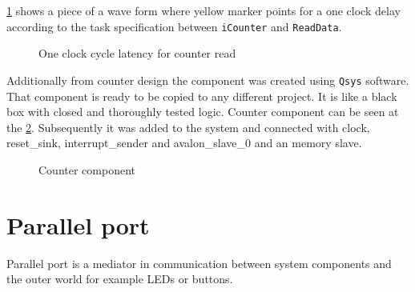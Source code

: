\figurename{} \ref{fig:counter_read_latency} shows a piece of a wave form where yellow marker points for a one clock delay according to the task specification between \verb|iCounter| and \verb|ReadData|.

\begin{figure}[H]
	\begin{center}
	\end{center}
	\caption{One clock cycle latency for counter read}
	\label{fig:counter_read_latency}
\end{figure}

Additionally from counter design the component was created using \verb|Qsys| software. That component is ready to be copied  to any different project. It is like a black box with closed and thoroughly tested logic. Counter component can be seen at the \figurename{} \ref{fig:interrupt_counter_component}. Subsequently it was added to the system and connected with clock, reset\_sink, interrupt\_sender and avalon\_slave\_0 and an memory slave.

\begin{figure}[H]
	\begin{center}
	\end{center}
	\caption{Counter component}
	\label{fig:interrupt_counter_component}
\end{figure}

\section{Parallel port}
Parallel port is a mediator in communication between system components and the outer world for example LEDs or buttons. 

